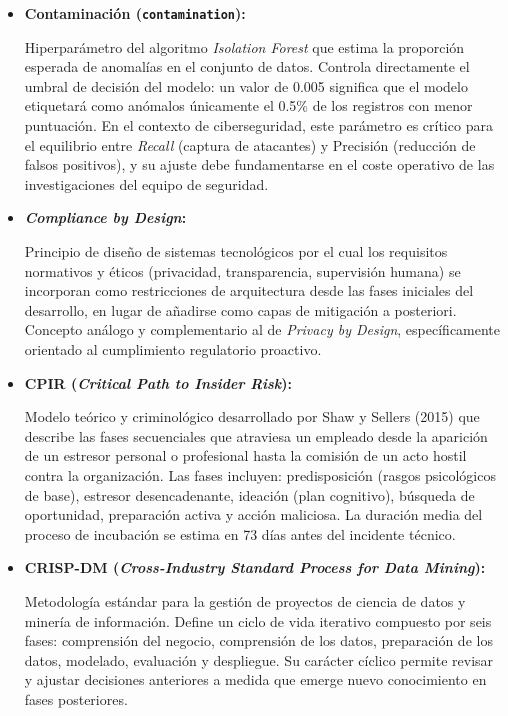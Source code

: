 \documentclass[IB]{TFUOC}%
\begin{document}
\begin{itemize}
    \item \textbf{Contaminación (\texttt{contamination}):}
    
    Hiperparámetro del algoritmo \textit{Isolation Forest} que estima la proporción esperada de anomalías en el conjunto de datos. Controla directamente el umbral de decisión del modelo: un valor de 0.005 significa que el modelo etiquetará como anómalos únicamente el 0.5\% de los registros con menor puntuación. En el contexto de ciberseguridad, este parámetro es crítico para el equilibrio entre \textit{Recall} (captura de atacantes) y Precisión (reducción de falsos positivos), y su ajuste debe fundamentarse en el coste operativo de las investigaciones del equipo de seguridad.


    \item \textbf{\textit{Compliance by Design}:}
    
    Principio de diseño de sistemas tecnológicos por el cual los requisitos normativos y éticos (privacidad, transparencia, supervisión humana) se incorporan como restricciones de arquitectura desde las fases iniciales del desarrollo, en lugar de añadirse como capas de mitigación a posteriori. Concepto análogo y complementario al de \textit{Privacy by Design}, específicamente orientado al cumplimiento regulatorio proactivo.

    \item \textbf{CPIR (\textit{Critical Path to Insider Risk}):}
    
    Modelo teórico y criminológico desarrollado por Shaw y Sellers (2015) que describe las fases secuenciales que atraviesa un empleado desde la aparición de un estresor personal o profesional hasta la comisión de un acto hostil contra la organización. Las fases incluyen: predisposición (rasgos psicológicos de base), estresor desencadenante, ideación (plan cognitivo), búsqueda de oportunidad, preparación activa y acción maliciosa. La duración media del proceso de incubación se estima en 73 días antes del incidente técnico.

    \item \textbf{CRISP-DM (\textit{Cross-Industry Standard Process for Data Mining}):}
    
    Metodología estándar para la gestión de proyectos de ciencia de datos y minería de información. Define un ciclo de vida iterativo compuesto por seis fases: comprensión del negocio, comprensión de los datos, preparación de los datos, modelado, evaluación y despliegue. Su carácter cíclico permite revisar y ajustar decisiones anteriores a medida que emerge nuevo conocimiento en fases posteriores.


\end{itemize}
\end{document}
